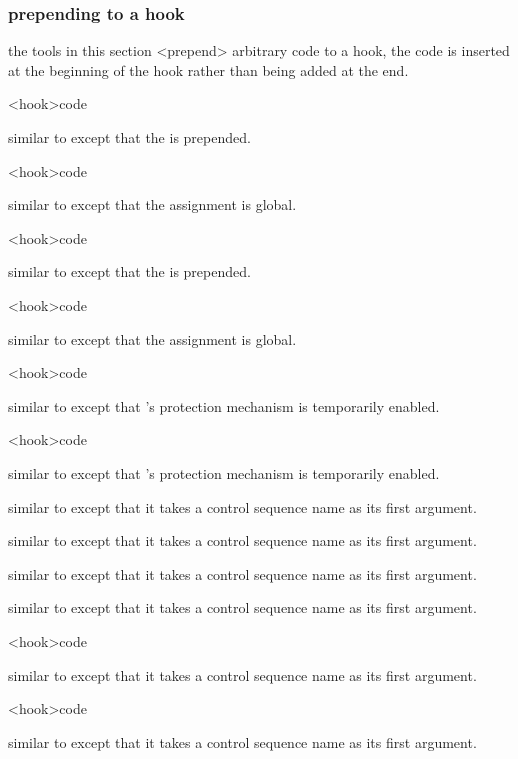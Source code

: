 \subsubsection{prepending to a hook}
\label{aut:hok:pre}

the tools in this section <prepend> arbitrary code to a hook, \ie the code is inserted at the beginning of the hook rather than being added at the end.

\begin{ltxsyntax}

<hook>{code}

similar to  except that the  is prepended.

<hook>{code}

similar to  except that the assignment is global.

<hook>{code}

similar to  except that the  is prepended.

<hook>{code}

similar to  except that the assignment is global.

<hook>{code}

similar to  except that \latex's protection mechanism is temporarily enabled.

<hook>{code}

similar to  except that \latex's protection mechanism is temporarily enabled.


similar to  except that it takes a control sequence name as its first argument.


similar to  except that it takes a control sequence name as its first argument.


similar to  except that it takes a control sequence name as its first argument.


similar to  except that it takes a control sequence name as its first argument.

<hook>{code}

similar to  except that it takes a control sequence name as its first argument.

<hook>{code}

similar to  except that it takes a control sequence name as its first argument.

\end{ltxsyntax}

